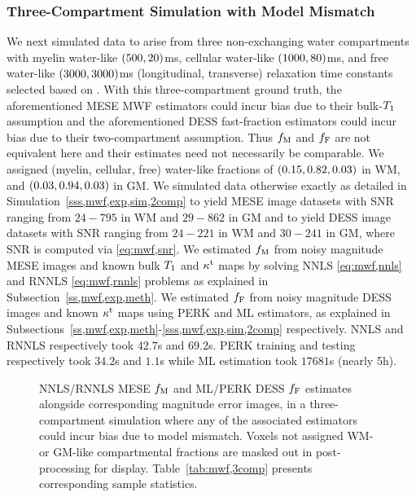 \subsubsection{Three-Compartment Simulation with Model Mismatch}
\label{sss,mwf,exp,sim,3comp}

We next simulated data
to arise from three non-exchanging water compartments
with myelin water-like $\paren{500,20}$ms,
cellular water-like $\paren{1000,80}$ms,
and 
free water-like $\paren{3000,3000}$ms
(longitudinal, transverse) relaxation time constants
selected based on \cite{mackay:94:ivv,deoni:11:com}.
With this three-compartment ground truth,
the aforementioned MESE MWF estimators 
could incur bias due to their bulk-$T_1$ assumption
and the aforementioned DESS fast-fraction estimators 
could incur bias due to their two-compartment assumption.
Thus $f_\mathrm{M}$ and $f_{\mathrm{F}}$ are not equivalent here
and their estimates need not necessarily be comparable.
We assigned (myelin, cellular, free) water-like fractions
of $\paren{0.15,0.82,0.03}$ in WM,
and $\paren{0.03,0.94,0.03}$ in GM.
We simulated data 
otherwise exactly as detailed in Simulation~\ref{sss,mwf,exp,sim,2comp}
to yield MESE image datasets
with SNR ranging from $24-795$ in WM
and $29-862$ in GM
and to yield DESS image datasets
with SNR ranging from $24-221$ in WM
and $30-241$ in GM,
where SNR is computed via \eqref{eq:mwf,snr}.
We estimated $f_\mathrm{M}$ 
from noisy magnitude MESE images
and known bulk $T_1$ and $\kappa^{\mathrm{t}}$ maps
by solving NNLS \eqref{eq:mwf,nnls}
and RNNLS \eqref{eq:mwf,rnnls} problems
as explained in Subsection~\ref{ss,mwf,exp,meth}.
We estimated $f_{\mathrm{F}}$ 
from noisy magnitude DESS images and known $\kappa^{\mathrm{t}}$ maps
using PERK and ML estimators,
as explained in Subsections~\ref{ss,mwf,exp,meth}-\ref{sss,mwf,exp,sim,2comp} respectively.
NNLS and RNNLS respectively took $42.7$s and $69.2$s.
PERK training and testing respectively took $34.2$s and $1.1$s
while ML estimation took $17681$s (nearly 5h).

\begin{figure}[!t]
	\centering
	\hspace{0cm}
	\caption{%
		NNLS/RNNLS MESE $f_\mathrm{M}$ and ML/PERK DESS $f_{\mathrm{F}}$ estimates 
		alongside corresponding magnitude error images,
		in a three-compartment simulation
		where any of the associated estimators
		could incur bias due to model mismatch.
		Voxels not assigned WM- or GM-like compartmental fractions
		are masked out in post-processing for display.
		Table~\ref{tab:mwf,3comp} presents corresponding sample statistics.
	}
	\label{fig:mwf,3comp}
\end{figure}

